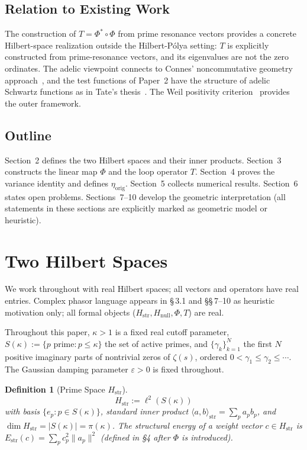\documentclass[11pt]{article}
\newtheorem{definition}[theorem]{Definition}
\newcommand{\Hstr}{H_{\mathrm{str}}}
\newcommand{\Hnull}{H_{\mathrm{null}}}
\newcommand{\Estr}{E_{\mathrm{str}}}
\newcommand{\etaorig}{\eta_{\mathrm{orig}}}
\begin{document}
\subsection{Relation to Existing Work}

The construction of $T=\Phi^*\circ\Phi$ from prime resonance vectors provides
a concrete Hilbert-space realization outside the Hilbert-P\'olya setting:
$T$ is explicitly constructed from prime-resonance vectors,
and its eigenvalues are not the zero ordinates.
The adelic viewpoint connects to Connes' noncommutative geometry
approach~\cite{Con99}, and the test functions of Paper~2 have the structure
of adelic Schwartz functions as in Tate's thesis~\cite{Tat50}. The Weil
positivity criterion~\cite{Wei52,Lag99} provides the outer framework.

\subsection{Outline}

Section~2 defines the two Hilbert spaces and their inner products.
Section~3 constructs the linear map $\Phi$ and the loop operator $T$.
Section~4 proves the variance identity and defines $\etaorig$.
Section~5 collects numerical results.
Section~6 states open problems.
Sections~7--10 develop the geometric interpretation (all statements in these
sections are explicitly marked as geometric model or heuristic).

\section{Two Hilbert Spaces}

We work throughout with real Hilbert spaces; all vectors and operators have
real entries. Complex phasor language appears in \S\,3.1 and \S\S\,7--10 as
heuristic motivation only; all formal objects ($\Hstr, \Hnull, \Phi, T$)
are real.

Throughout this paper, $\kappa>1$ is a fixed real cutoff parameter,
$S(\kappa):=\{p\text{ prime}:p\leq\kappa\}$ the set of active primes,
and $\{\gamma_k\}_{k=1}^N$ the first $N$ positive imaginary parts of
nontrivial zeros of $\zeta(s)$, ordered $0<\gamma_1\leq\gamma_2\leq\cdots$.
The Gaussian damping parameter $\varepsilon>0$ is fixed throughout.

\begin{definition}[Prime Space $\Hstr$]
\[
\Hstr := \ell^2(S(\kappa))
\]
with basis $\{e_p : p\in S(\kappa)\}$, standard inner product
$\langle a,b\rangle_{\mathrm{str}}=\sum_p a_p b_p$, and
$\dim\Hstr=|S(\kappa)|=\pi(\kappa)$.
The \emph{structural energy} of a weight vector $c\in\Hstr$ is
$\Estr(c)=\sum_p c_p^2\|a_p\|^2$ (defined in \S4 after $\Phi$ is introduced).
\end{definition}
\end{document}
